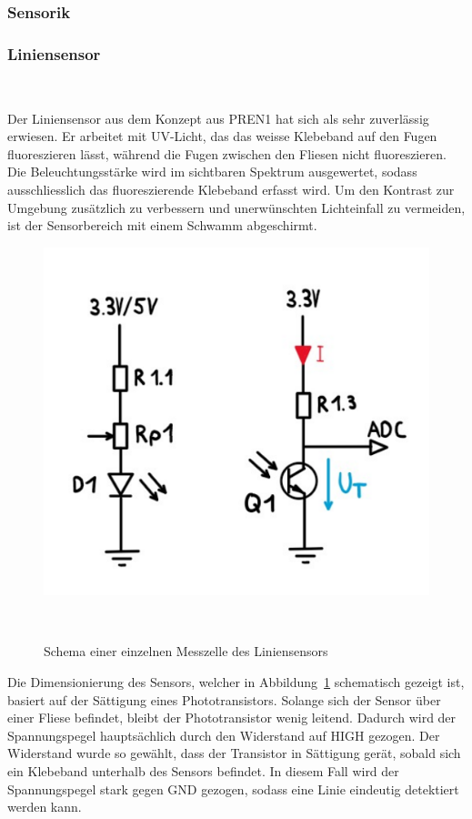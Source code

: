 \documentclass[main.tex]{subfiles} %
\begin{document}

\subsubsection{Sensorik}

\subsubsection*{Liniensensor}~\label{sec:Sensorik_Liniensensor}

Der Liniensensor aus dem Konzept aus PREN1 hat sich als sehr zuverlässig
erwiesen. Er arbeitet mit UV-Licht, das das weisse Klebeband auf den Fugen
fluoreszieren lässt, während die Fugen zwischen den Fliesen nicht
fluoreszieren. Die Beleuchtungsstärke wird im sichtbaren Spektrum ausgewertet,
sodass ausschliesslich das fluoreszierende Klebeband erfasst wird. Um den
Kontrast zur Umgebung zusätzlich zu verbessern und unerwünschten Lichteinfall
zu vermeiden, ist der Sensorbereich mit einem Schwamm abgeschirmt.

\begin{figure}[H]
    \centering
    \includegraphics[width = 0.5\linewidth]{./fig_Antriebsregelung_Firmware/Schema_Messzelle_Liniensensor.pdf}
    \caption{Schema einer einzelnen Messzelle des Liniensensors}~\label{fig:Schema_Messtelle_Liniensensor}
\end{figure}

Die Dimensionierung des Sensors, welcher in
Abbildung~\ref{fig:Schema_Messtelle_Liniensensor} schematisch gezeigt ist,
basiert auf der Sättigung eines Phototransistors. Solange sich der Sensor über
einer Fliese befindet, bleibt der Phototransistor wenig leitend. Dadurch wird
der Spannungspegel hauptsächlich durch den Widerstand auf HIGH gezogen. Der
Widerstand wurde so gewählt, dass der Transistor in Sättigung gerät, sobald
sich ein Klebeband unterhalb des Sensors befindet. In diesem Fall wird der
Spannungspegel stark gegen GND gezogen, sodass eine Linie eindeutig detektiert
werden kann.
\end{document}
